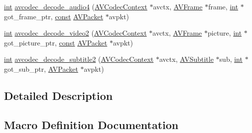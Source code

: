 \begin{DoxyCompactItemize}
\item 
\hyperlink{xmltok_8h_a5a0d4a5641ce434f1d23533f2b2e6653}{int} \hyperlink{group__lavc__decoding_ga834bb1b062fbcc2de4cf7fb93f154a3e}{avcodec\+\_\+decode\+\_\+audio4} (\hyperlink{struct_a_v_codec_context}{A\+V\+Codec\+Context} $\ast$avctx, \hyperlink{struct_a_v_frame}{A\+V\+Frame} $\ast$frame, \hyperlink{xmltok_8h_a5a0d4a5641ce434f1d23533f2b2e6653}{int} $\ast$got\+\_\+frame\+\_\+ptr, \hyperlink{getopt1_8c_a2c212835823e3c54a8ab6d95c652660e}{const} \hyperlink{struct_a_v_packet}{A\+V\+Packet} $\ast$avpkt)
\item 
\hyperlink{xmltok_8h_a5a0d4a5641ce434f1d23533f2b2e6653}{int} \hyperlink{group__lavc__decoding_ga99ee61b6dcffb7817a275d39da58cc74}{avcodec\+\_\+decode\+\_\+video2} (\hyperlink{struct_a_v_codec_context}{A\+V\+Codec\+Context} $\ast$avctx, \hyperlink{struct_a_v_frame}{A\+V\+Frame} $\ast$picture, \hyperlink{xmltok_8h_a5a0d4a5641ce434f1d23533f2b2e6653}{int} $\ast$got\+\_\+picture\+\_\+ptr, \hyperlink{getopt1_8c_a2c212835823e3c54a8ab6d95c652660e}{const} \hyperlink{struct_a_v_packet}{A\+V\+Packet} $\ast$avpkt)
\item 
\hyperlink{xmltok_8h_a5a0d4a5641ce434f1d23533f2b2e6653}{int} \hyperlink{group__lavc__decoding_ga47db1b7f294b9f92684401b9c66a7c4b}{avcodec\+\_\+decode\+\_\+subtitle2} (\hyperlink{struct_a_v_codec_context}{A\+V\+Codec\+Context} $\ast$avctx, \hyperlink{struct_a_v_subtitle}{A\+V\+Subtitle} $\ast$sub, \hyperlink{xmltok_8h_a5a0d4a5641ce434f1d23533f2b2e6653}{int} $\ast$got\+\_\+sub\+\_\+ptr, \hyperlink{struct_a_v_packet}{A\+V\+Packet} $\ast$avpkt)
\end{DoxyCompactItemize}


\subsection{Detailed Description}


\subsection{Macro Definition Documentation}
